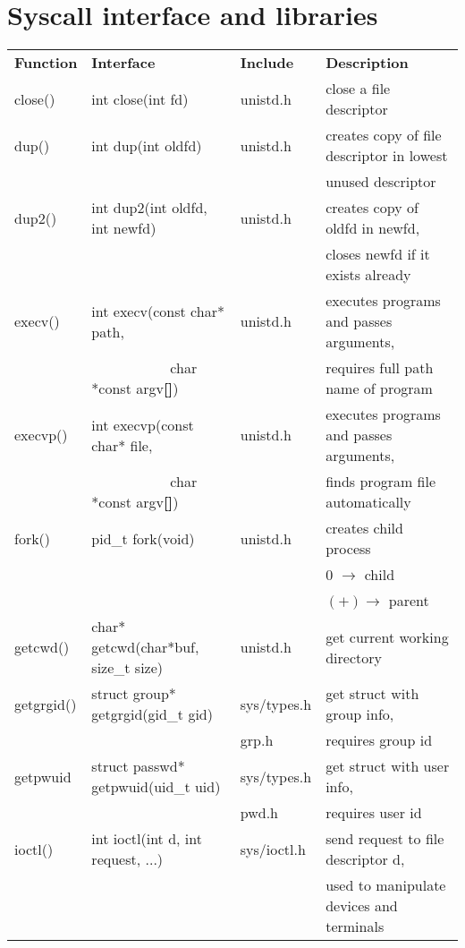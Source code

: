 \documentclass{article}
\begin{document}
\section{Syscall interface and libraries}
\begin{tabular}{llll}
    \bf Function & \bf Interface & \bf Include & \bf Description
    \\
    close() & int close(int fd) & unistd.h & close a file descriptor
    \\
    \hline
    dup() & int dup(int oldfd) & unistd.h & creates copy of file descriptor in lowest 
    \\ 
    & & &unused descriptor 
    \\ \hline
    dup2() & int dup2(int oldfd, int newfd) & unistd.h & creates copy of oldfd in newfd, 
    \\
    & & &closes newfd if it exists already 
    \\ \hline
    execv() & int execv(const char* path, & unistd.h & executes programs and 
        passes arguments, 
    \\ \hline
    &  \ \ \ \ \ \ \ \ \ \ \ char *const argv\textbf{[]}) & &requires full path name of program
    \\ \hline
    execvp() & int execvp(const char* file, & unistd.h & executes programs and 
        passes arguments, 
    \\
    &  \ \ \ \ \ \ \ \ \ \ \ char *const argv\textbf{[]}) & &finds program file automatically
    \\ \hline
    fork() & pid\_t fork(void) & unistd.h & creates child process
    \\
    & & & 0 $\rightarrow$ child
    \\
    & & & $(+) \rightarrow$ parent
    \\ \hline
    getcwd() & char* getcwd(char*buf, size\_t size)& unistd.h & get current working directory
    \\ \hline
    getgrgid() & struct group* getgrgid(gid\_t gid) & sys/types.h & get struct with group info,
    \\
    & &grp.h  &requires group id
    \\ \hline
    getpwuid & struct passwd* getpwuid(uid\_t uid) & sys/types.h & get struct with user info,
    \\
    & & pwd.h &requires user id
    \\ \hline
    ioctl() & int ioctl(int d, int request, ...) & sys/ioctl.h & send request to file descriptor d,
    \\
    & & & used to manipulate devices and terminals

\end{tabular}
\end{document}
